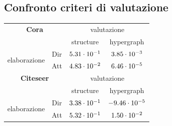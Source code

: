 \subsection{Confronto criteri di valutazione}
%
\begin{center}
	\begin{tabular}{|cc|c|c|} %
		\hline
		\multicolumn{2}{|c|}{\textbf{Cora}} & \multicolumn{2}{|c|}{valutazione} \\
		\multicolumn{2}{|c|}{\ } & structure & hypergraph \\
		\hline
		\multirow{2}{*}{elaborazione} & Dir & \textcolor{red}{$5.31\cdot 10^{-1}$} & \textcolor{red}{$3.85 \cdot 10^{-3}$} \\
		& Att & $4.83 \cdot 10^{-2}$ & $6.46 \cdot 10^{-5}$ \\
		\hline
		\hline
		\hline
		\multicolumn{2}{|c|}{\textbf{Citeseer}} & \multicolumn{2}{|c|}{valutazione} \\
		\multicolumn{2}{|c|}{\ } & structure & hypergraph \\
		\hline
		\multirow{2}{*}{elaborazione} & Dir & $3.38\cdot 10^{-1}$ & $-9.46 \cdot 10^{-5}$ \\
		& Att & \textcolor{red}{$5.32 \cdot 10^{-1}$} & \textcolor{red}{$1.50 \cdot 10^{-2}$} \\
		\hline
	\end{tabular}
	\label{tab:4_valutazioni_err}
\end{center}



